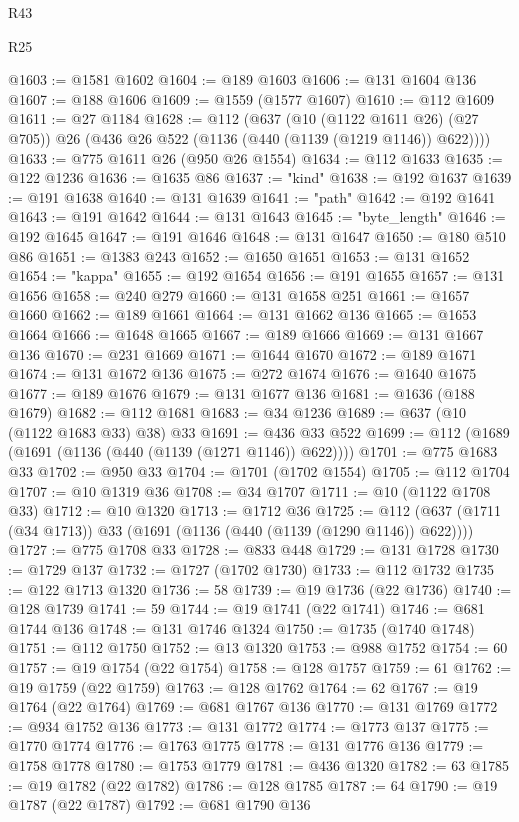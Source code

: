 \begin{lexlean}{R43}
\begin{lexlean}{R25}
\begin{coremodule}
{{{{{{{{{{{{{{{{{{{{{{{{{{{{{{{{{{{{{{{{{{{{{{{{{{{{{{{{{{{{{{{{{{{{{{{{{{{{{{{{{{{{{{{{{{{{{{{{{{{{{{{{{{{{{{{{{{{{{{{{{{{{{{{{{{{{{{{{{{{{{{{{{{{{{{{{{{{{{{{{{{{{{{{{{{{{{{{{{{{{{{{{{{{{{{{{{@1603 := @1581 @1602
@1604 := @189 @1603
@1606 := @131 @1604 @136
@1607 := @188 @1606
@1609 := @1559 (@1577 @1607)
@1610 := @112 @1609
@1611 := @27 @1184
@1628 := @112
    (@637
      (@10 (@1122 @1611 @26) (@27 @705))
      @26
      (@436 @26 @522 (@1136 (@440 (@1139 (@1219 @1146)) @622))))
@1633 := @775 @1611 @26 (@950 @26 @1554)
@1634 := @112 @1633
@1635 := @122 @1236
@1636 := @1635 @86
@1637 := "kind"
@1638 := @192 @1637
@1639 := @191 @1638
@1640 := @131 @1639
@1641 := "path"
@1642 := @192 @1641
@1643 := @191 @1642
@1644 := @131 @1643
@1645 := "byte_length"
@1646 := @192 @1645
@1647 := @191 @1646
@1648 := @131 @1647
@1650 := @180 @510 @86
@1651 := @1383 @243
@1652 := @1650 @1651
@1653 := @131 @1652
@1654 := "kappa"
@1655 := @192 @1654
@1656 := @191 @1655
@1657 := @131 @1656
@1658 := @240 @279
@1660 := @131 @1658 @251
@1661 := @1657 @1660
@1662 := @189 @1661
@1664 := @131 @1662 @136
@1665 := @1653 @1664
@1666 := @1648 @1665
@1667 := @189 @1666
@1669 := @131 @1667 @136
@1670 := @231 @1669
@1671 := @1644 @1670
@1672 := @189 @1671
@1674 := @131 @1672 @136
@1675 := @272 @1674
@1676 := @1640 @1675
@1677 := @189 @1676
@1679 := @131 @1677 @136
@1681 := @1636 (@188 @1679)
@1682 := @112 @1681
@1683 := @34 @1236
@1689 := @637 (@10 (@1122 @1683 @33) @38) @33
@1691 := @436 @33 @522
@1699 := @112 (@1689 (@1691 (@1136 (@440 (@1139 (@1271 @1146)) @622))))
@1701 := @775 @1683 @33
@1702 := @950 @33
@1704 := @1701 (@1702 @1554)
@1705 := @112 @1704
@1707 := @10 @1319 @36
@1708 := @34 @1707
@1711 := @10 (@1122 @1708 @33)
@1712 := @10 @1320
@1713 := @1712 @36
@1725 := @112 (@637 (@1711 (@34 @1713)) @33 (@1691 (@1136 (@440 (@1139 (@1290 @1146)) @622))))
@1727 := @775 @1708 @33
@1728 := @833 @448
@1729 := @131 @1728
@1730 := @1729 @137
@1732 := @1727 (@1702 @1730)
@1733 := @112 @1732
@1735 := @122 @1713 @1320
@1736 := 58
@1739 := @19 @1736 (@22 @1736)
@1740 := @128 @1739
@1741 := 59
@1744 := @19 @1741 (@22 @1741)
@1746 := @681 @1744 @136
@1748 := @131 @1746 @1324
@1750 := @1735 (@1740 @1748)
@1751 := @112 @1750
@1752 := @13 @1320
@1753 := @988 @1752
@1754 := 60
@1757 := @19 @1754 (@22 @1754)
@1758 := @128 @1757
@1759 := 61
@1762 := @19 @1759 (@22 @1759)
@1763 := @128 @1762
@1764 := 62
@1767 := @19 @1764 (@22 @1764)
@1769 := @681 @1767 @136
@1770 := @131 @1769
@1772 := @934 @1752 @136
@1773 := @131 @1772
@1774 := @1773 @137
@1775 := @1770 @1774
@1776 := @1763 @1775
@1778 := @131 @1776 @136
@1779 := @1758 @1778
@1780 := @1753 @1779
@1781 := @436 @1320
@1782 := 63
@1785 := @19 @1782 (@22 @1782)
@1786 := @128 @1785
@1787 := 64
@1790 := @19 @1787 (@22 @1787)
@1792 := @681 @1790 @136
}}}}}}}}}}}}}}}}}}}}}}}}}}}}}}}}}}}}}}}}}}}}}}}}}}}}}}}}}}}}}}}}}}}}}}}}}}}}}}}}}}}}}}}}}}}}}}}}}}}}}}}}}}}}}}}}}}}}}}}}}}}}}}}}}}}}}}}}}}}}}}}}}}}}}}}}}}}}}}}}}}}}}}}}}}}}}}}}}}}}}}}}}}}}}}}}}
\end{coremodule}
\end{lexlean}
\end{lexlean}
